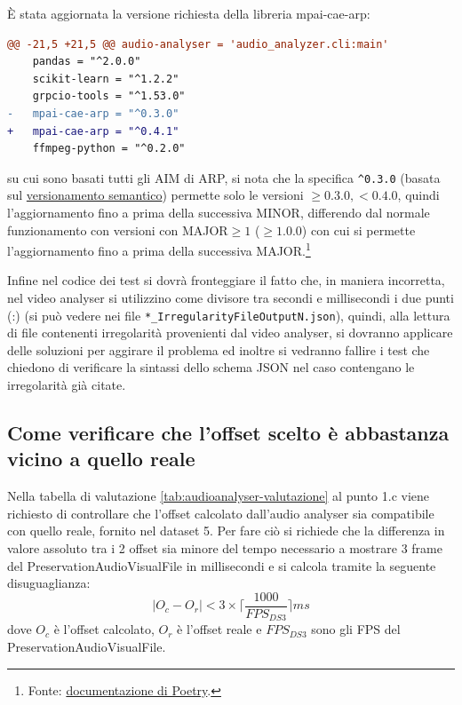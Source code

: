 È stata aggiornata la versione richiesta della libreria mpai-cae-arp:
\begin{lstlisting}[language=diff]
@@ -21,5 +21,5 @@ audio-analyser = 'audio_analyzer.cli:main'
    pandas = "^2.0.0"
    scikit-learn = "^1.2.2"
    grpcio-tools = "^1.53.0"
-   mpai-cae-arp = "^0.3.0"
+   mpai-cae-arp = "^0.4.1"
    ffmpeg-python = "^0.2.0"
\end{lstlisting}
su cui sono basati tutti gli \ac{AIM} di \ac{ARP}, si nota che la specifica \verb|^0.3.0| (basata sul \href{https://semver.org/lang/it/}{versionamento semantico}) permette solo le versioni $\ge0.3.0, <0.4.0$, quindi l'aggiornamento fino a prima della successiva MINOR, differendo dal normale funzionamento con versioni con MAJOR$\ge1$ ($\ge1.0.0$) con cui si permette l'aggiornamento fino a prima della successiva MAJOR.\footnote{Fonte: \href{https://python-poetry.org/docs/dependency-specification/\#caret-requirements}{documentazione di Poetry}.}

Infine nel codice dei test si dovrà fronteggiare il fatto che, in maniera incorretta, nel video analyser si utilizzino come divisore tra secondi e millisecondi i due punti (:) (si può vedere nei file \verb|*_IrregularityFileOutputN.json|), quindi, alla lettura di file contenenti irregolarità provenienti dal video analyser, si dovranno applicare delle soluzioni per aggirare il problema ed inoltre si vedranno fallire i test che chiedono di verificare la sintassi dello schema JSON nel caso contengano le irregolarità già citate.


\subsection{Come verificare che l'offset scelto è abbastanza vicino a quello reale} \label{ssec:audioanalyser-offset}   %
Nella tabella di valutazione \ref{tab:audioanalyser-valutazione} al punto 1.c viene richiesto di controllare che l'offset calcolato dall'audio analyser sia compatibile con quello reale, fornito nel dataset 5.
Per fare ciò si richiede che la differenza in valore assoluto tra i 2 offset sia minore del tempo necessario a mostrare 3 frame del PreservationAudioVisualFile in millisecondi e si calcola tramite la seguente disuguaglianza:
\begin{equation}
    |O_c - O_r| < 3 \times \lceil\frac{1000}{FPS_{DS3}}\rceil ms
\end{equation}
dove $O_c$ è l'offset calcolato, $O_r$ è l'offset reale e $FPS_{DS3}$ sono gli FPS del PreservationAudioVisualFile.

